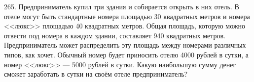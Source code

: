 265. Предприниматель купил три здания и собирается открыть в них отель. В отеле могут быть стандартные номера площадью 30 квадратных метров и номера <<люкс>> площадью 40 квадратных метров. Общая площадь, которую можно отвести под номера в каждом здании, составляет 940 квадратных метров. Предприниматель может распределить эту площадь между номерами различных типов, как хочет. Обычный номер будет приносить отелю 4000 рублей в сутки, а номер <<люкс>> --- 5000 рублей в сутки. Какую наибольшую сумму денег сможет заработать в сутки на своём отеле предприниматель?\\
